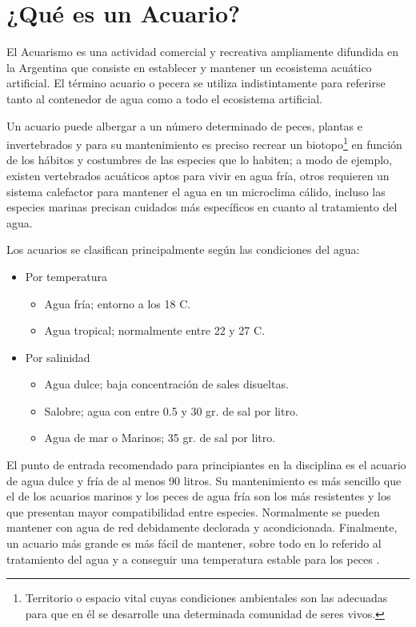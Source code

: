 \section{¿Qué es un Acuario?}
\label{sec:acuario}

El Acuarismo es una actividad comercial y recreativa ampliamente difundida en la Argentina que consiste en establecer y mantener un ecosistema acuático artificial. El término acuario o pecera se utiliza indistintamente para referirse tanto al contenedor de agua como a todo el ecosistema artificial. 

Un acuario puede albergar a un número determinado de peces, plantas e invertebrados y para su mantenimiento es preciso recrear un biotopo\footnote{Territorio o espacio vital cuyas condiciones ambientales son las adecuadas para que en él se desarrolle una determinada comunidad de seres vivos.} en función de los hábitos y costumbres de las especies que lo habiten; a modo de ejemplo, existen vertebrados acuáticos aptos para vivir en agua fría, otros requieren un sistema calefactor para mantener el agua en un microclima cálido, incluso las especies marinas precisan cuidados más específicos en cuanto al tratamiento del agua.

Los acuarios se clasifican principalmente según las condiciones del agua:
\begin{itemize}
	\item Por temperatura
	\begin{itemize}
		\item Agua fría; entorno a los 18 \grados C.
		\item Agua tropical; normalmente entre 22 y 27 \grados C.
	\end{itemize}
	\vspace{5px}
	\item Por salinidad
	\begin{itemize}
		\item Agua dulce; baja concentración de sales disueltas.
		\item Salobre; agua con entre 0.5 y 30 gr. de sal por litro.
		\item Agua de mar o Marinos; 35 gr. de sal por litro. 
	\end{itemize}
\end{itemize}

El punto de entrada recomendado para principiantes en la disciplina es el acuario de agua dulce y fría de al menos 90 litros.  Su mantenimiento es más sencillo que el de los acuarios marinos y los peces de agua fría son los más resistentes y los que presentan mayor compatibilidad entre especies. Normalmente se pueden mantener con agua de red debidamente declorada y acondicionada. Finalmente, un acuario más grande es más fácil de mantener, sobre todo en lo referido al tratamiento del agua y a conseguir una temperatura estable para los peces \citep{paradais1}.

